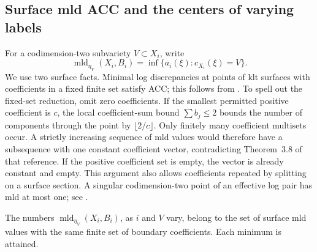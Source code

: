 \subsection{Surface mld ACC and the centers of varying labels}

For a codimension-two subvariety $V\subset X_i$, write
\[
 \operatorname{mld}_{\eta_V}(X_i,B_i)
 =\inf\{a_i(\xi):c_{X_i}(\xi)=V\}.
\]
We use two surface facts. Minimal log discrepancies at points of klt surfaces with coefficients in a fixed finite set satisfy ACC; this follows from \cite[Theorems~3.1 and 3.8]{Alexeev1993}. To spell out the fixed-set reduction, omit zero coefficients. If the smallest permitted positive coefficient is $c$, the local coefficient-sum bound $\sum b_j\leq2$ bounds the number of components through the point by $\lfloor2/c\rfloor$. Only finitely many coefficient multisets occur. A strictly increasing sequence of mld values would therefore have a subsequence with one constant coefficient vector, contradicting Theorem~3.8 of that reference. If the positive coefficient set is empty, the vector is already constant and empty. This argument also allows coefficients repeated by splitting on a surface section. A singular codimension-two point of an effective log pair has mld at most one; see \cite[Proposition~3.2, arXiv version]{Ambro1999}.

\begin{lemma}\label{lem:transverse-mld}
The numbers $\operatorname{mld}_{\eta_V}(X_i,B_i)$, as $i$ and $V$ vary, belong to the set of surface mld values with the same finite set of boundary coefficients. Each minimum is attained.
\end{lemma}


